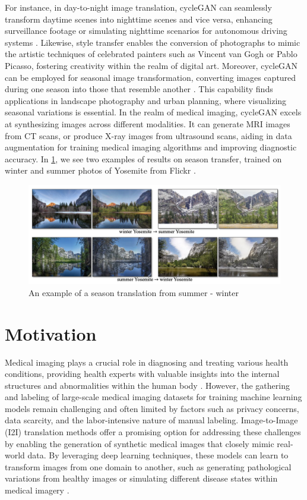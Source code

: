 \documentclass[UKenglish,12pt]{master-style}
\begin{document}
For instance, in day-to-night image translation, cycleGAN can seamlessly transform daytime scenes into nighttime scenes and vice versa, enhancing surveillance footage or simulating nighttime scenarios for autonomous driving systems \cite{satellite_image}. Likewise, style transfer enables the conversion of photographs to mimic the artistic techniques of celebrated painters such as Vincent van Gogh or Pablo Picasso, fostering creativity within the realm of digital art. Moreover, cycleGAN can be employed for seasonal image transformation, converting images captured during one season into those that resemble another \cite{style_transfer}. This capability finds applications in landscape photography and urban planning, where visualizing seasonal variations is essential. In the realm of medical imaging, cycleGAN excels at synthesizing images across different modalities. It can generate MRI images from CT scans, or produce X-ray images from ultrasound scans, aiding in data augmentation for training medical imaging algorithms and improving diagnostic accuracy. In \ref{fig:winter_summer}, we see two examples of results on season transfer, trained on winter and summer photos of Yosemite from Flickr \cite{unpaired} .

\begin{figure}[ht]
    \centering
    \includegraphics[width=1\textwidth]{Images/winter_summer.png}
    \caption{An example of a season translation from summer - winter}
    \label{fig:winter_summer}
\end{figure}

\section{Motivation}

Medical imaging plays a crucial role in diagnosing and treating various health conditions, providing health experts with valuable insights into the internal structures and abnormalities within the human body \cite{medicalimage}. However, the gathering and labeling of large-scale medical imaging datasets for training machine learning models remain challenging and often limited by factors such as privacy concerns, data scarcity, and the labor-intensive nature of manual labeling. Image-to-Image (I2I) translation methods offer a promising option for addressing these challenges by enabling the generation of synthetic medical images that closely mimic real-world data. By leveraging deep learning techniques, these models can learn to transform images from one domain to another, such as generating pathological variations from healthy images or simulating different disease states within medical imagery \cite{I2I}.
\end{document}
